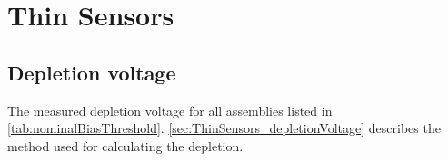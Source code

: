 \chapter{Thin Sensors}
\label{sec:appendix_ThinSensors}

\section{Depletion voltage}

The measured depletion voltage for all assemblies listed in
\cref{tab:nominalBiasThreshold}. \cref{sec:ThinSensors_depletionVoltage}
describes the method used for calculating the depletion.


